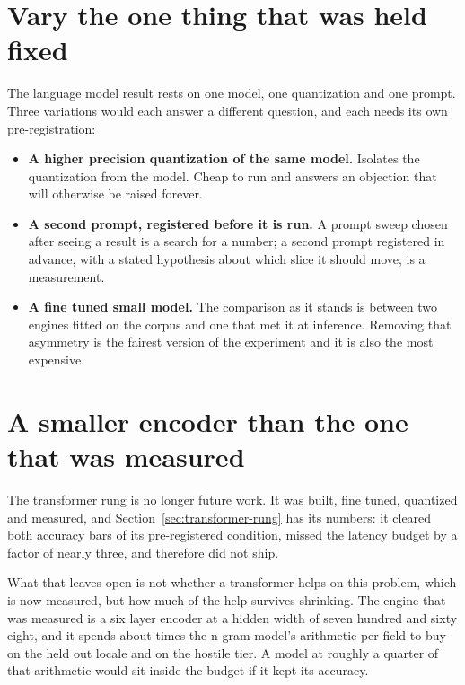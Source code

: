 \section{Vary the one thing that was held fixed}

The language model result rests on one model, one quantization and one prompt.
Three variations would each answer a different question, and each needs its own
pre-registration:

\begin{itemize}
  \item \textbf{A higher precision quantization of the same model.} Isolates the
    quantization from the model. Cheap to run and answers an objection that will
    otherwise be raised forever.
  \item \textbf{A second prompt, registered before it is run.} A prompt sweep
    chosen after seeing a result is a search for a number; a second prompt
    registered in advance, with a stated hypothesis about which slice it should
    move, is a measurement.
  \item \textbf{A fine tuned small model.} The comparison as it stands is
    between two engines fitted on the corpus and one that met it at inference.
    Removing that asymmetry is the fairest version of the experiment and it is
    also the most expensive.
\end{itemize}

\section{A smaller encoder than the one that was measured}

The transformer rung is no longer future work. It was built, fine tuned,
quantized and measured, and Section~\ref{sec:transformer-rung} has its numbers:
it cleared both accuracy bars of its pre-registered condition, missed the latency
budget by a factor of nearly three, and therefore did not ship.

What that leaves open is not whether a transformer helps on this problem, which
is now measured, but how much of the help survives shrinking. The engine that was
measured is a six layer encoder at a hidden width of seven hundred and sixty
eight, and it spends about \vBertLatencyRatio{} times the n-gram model's
arithmetic per field to buy \vBertUnseenGain{} on the held out locale and
\vBertHostileGain{} on the hostile tier. A model at roughly a quarter of that
arithmetic would sit inside the budget if it kept its accuracy.


